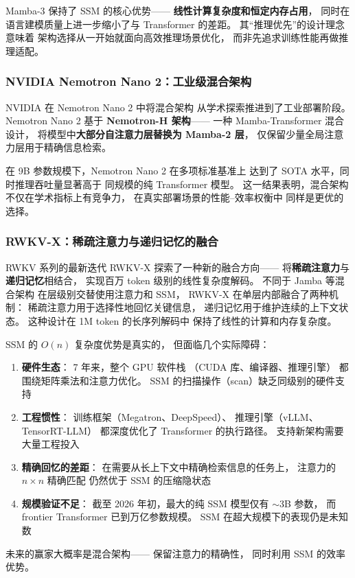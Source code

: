 Mamba-3 保持了 SSM 的核心优势——
\textbf{线性计算复杂度和恒定内存占用}，
同时在语言建模质量上进一步缩小了与 Transformer 的差距。
其``推理优先''的设计理念意味着
架构选择从一开始就面向高效推理场景优化，
而非先追求训练性能再做推理适配。

\subsubsection{NVIDIA Nemotron Nano 2：工业级混合架构}

NVIDIA 在 Nemotron Nano 2 中将混合架构
从学术探索推进到了工业部署阶段。
Nemotron Nano 2 基于 \textbf{Nemotron-H 架构}——
一种 Mamba-Transformer 混合设计，
将模型中\textbf{大部分自注意力层替换为 Mamba-2 层}，
仅保留少量全局注意力层用于精确信息检索。

在 9B 参数规模下，Nemotron Nano 2 在多项标准基准上
达到了 SOTA 水平，同时推理吞吐量显著高于
同规模的纯 Transformer 模型。
这一结果表明，混合架构不仅在学术指标上有竞争力，
在真实部署场景的性能--效率权衡中
同样是更优的选择。

\subsubsection{RWKV-X：稀疏注意力与递归记忆的融合}

RWKV 系列的最新迭代 RWKV-X 探索了一种新的融合方向——
将\textbf{稀疏注意力}与\textbf{递归记忆}相结合，
实现百万 token 级别的线性复杂度解码。
不同于 Jamba 等混合架构
在层级别交替使用注意力和 SSM，
RWKV-X 在单层内部融合了两种机制：
稀疏注意力用于选择性地回忆关键信息，
递归记忆用于维护连续的上下文状态。
这种设计在 1M token 的长序列解码中
保持了线性的计算和内存复杂度。

\begin{whybox}
SSM 的 $O(n)$ 复杂度优势是真实的，
但面临几个实际障碍：
\begin{enumerate}[noitemsep]
  \item \textbf{硬件生态}：
        7 年来，整个 GPU 软件栈
        （CUDA 库、编译器、推理引擎）
        都围绕矩阵乘法和注意力优化。
        SSM 的扫描操作（scan）缺乏同级别的硬件支持
  \item \textbf{工程惯性}：
        训练框架（Megatron、DeepSpeed）、
        推理引擎（vLLM、TensorRT-LLM）
        都深度优化了 Transformer 的执行路径。
        支持新架构需要大量工程投入
  \item \textbf{精确回忆的差距}：
        在需要从长上下文中精确检索信息的任务上，
        注意力的 $n \times n$ 精确匹配
        仍然优于 SSM 的压缩隐状态
  \item \textbf{规模验证不足}：
        截至 2026 年初，最大的纯 SSM 模型仅有 $\sim$3B 参数，
        而 frontier Transformer 已到万亿参数规模。
        SSM 在超大规模下的表现仍是未知数
\end{enumerate}
未来的赢家大概率是混合架构——
保留注意力的精确性，
同时利用 SSM 的效率优势。
\end{whybox}

